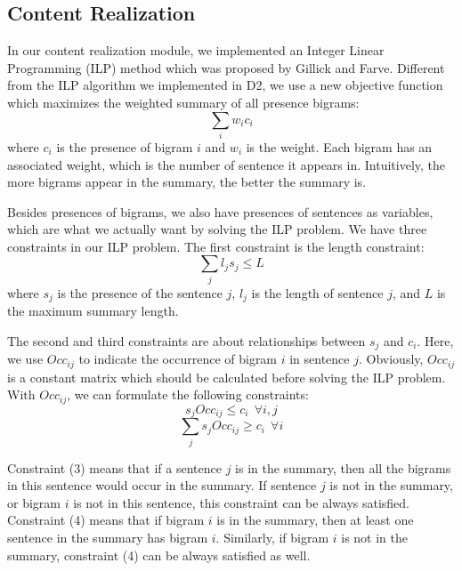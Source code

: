 \documentclass[11pt]{article}
\begin{document}
\subsection{Content Realization}

In our content realization module, we implemented an Integer Linear Programming (ILP) method which was proposed by Gillick and Farve\cite{Gillick:09}. Different from the ILP algorithm we implemented in D2, we use a new objective function which maximizes the weighted summary of all presence bigrams:  
\begin{equation}
	\sum_i{w_ic_i}
\end{equation} 
where $c_i$ is the presence of bigram $i$ and $w_i$ is the weight. Each bigram has an associated weight, which is the number of sentence it appears in. Intuitively, the more bigrams appear in the summary, the better the summary is. 

Besides presences of bigrams, we also have presences of sentences as variables, which are what we actually want by solving the ILP problem. We have three constraints in our ILP problem. The first constraint is the length constraint:
\begin{equation}
	\sum_j{l_js_j} \leq L 
\end{equation} 
where $s_j$ is the presence of the sentence $j$, $l_j$ is the length of sentence $j$, and $L$ is the maximum summary length. 

The second and third constraints are about relationships between $s_j$ and $c_i$. Here, we use $Occ_{ij}$ to indicate the occurrence of bigram $i$ in sentence $j$. Obviously, $Occ_{ij}$ is a constant matrix which should be calculated before solving the ILP problem. With $Occ_{ij}$, we can formulate the following constraints:
\begin{equation}
	s_jOcc_{ij} \leq c_i\ \  \forall i,j
\end{equation}
\begin{equation}
	\sum_j s_jOcc_{ij} \geq c_i\ \  \forall i
\end{equation}

Constraint (3) means that if a sentence $j$ is in the summary, then all the bigrams in this sentence would occur in the summary. If sentence $j$ is not in the summary, or bigram $i$ is not in this sentence, this constraint can be always satisfied. Constraint (4) means that if bigram $i$ is in the summary, then at least one sentence in the summary has bigram $i$. Similarly, if bigram $i$ is not in the summary, constraint (4) can be always satisfied as well.
\end{document}
